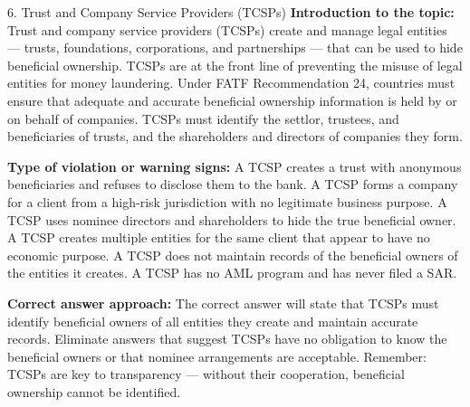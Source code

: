 \documentclass[11pt,a4paper]{beamer}
\begin{document}
\begin{frame}{6. Trust and Company Service Providers (TCSPs)}
\tiny
\noindent\textbf{Introduction to the topic:} Trust and company service providers (TCSPs) create and manage legal entities — trusts, foundations, corporations, and partnerships — that can be used to hide beneficial ownership. TCSPs are at the front line of preventing the misuse of legal entities for money laundering. Under FATF Recommendation 24, countries must ensure that adequate and accurate beneficial ownership information is held by or on behalf of companies. TCSPs must identify the settlor, trustees, and beneficiaries of trusts, and the shareholders and directors of companies they form.

\vspace{0.1cm}
\noindent\textbf{Type of violation or warning signs:} A TCSP creates a trust with anonymous beneficiaries and refuses to disclose them to the bank. A TCSP forms a company for a client from a high-risk jurisdiction with no legitimate business purpose. A TCSP uses nominee directors and shareholders to hide the true beneficial owner. A TCSP creates multiple entities for the same client that appear to have no economic purpose. A TCSP does not maintain records of the beneficial owners of the entities it creates. A TCSP has no AML program and has never filed a SAR.

\vspace{0.1cm}
\noindent\textbf{Correct answer approach:} The correct answer will state that TCSPs must identify beneficial owners of all entities they create and maintain accurate records. Eliminate answers that suggest TCSPs have no obligation to know the beneficial owners or that nominee arrangements are acceptable. Remember: TCSPs are key to transparency — without their cooperation, beneficial ownership cannot be identified.
\end{frame}
\end{document}
